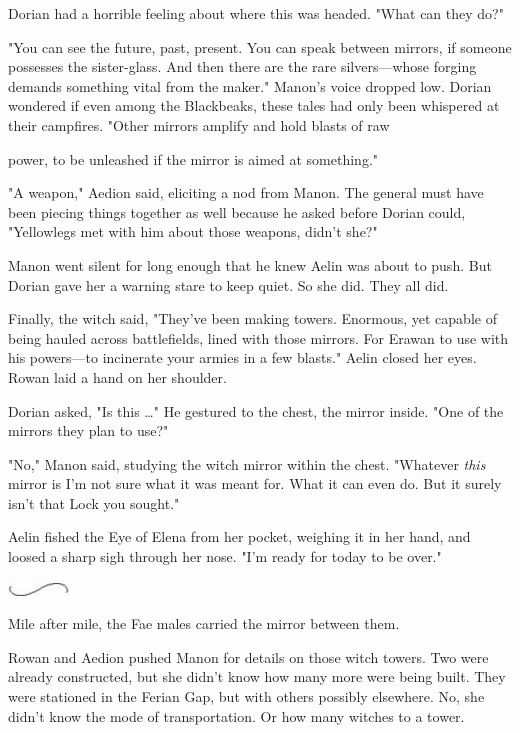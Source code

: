 Dorian had a horrible feeling about where this was headed. "What can they do?"

"You can see the future, past, present. You can speak between mirrors, if someone possesses the sister-glass. And then there are the rare silvers---whose forging demands something vital from the maker." Manon's voice dropped low. Dorian wondered if even among the Blackbeaks, these tales had only been whispered at their campfires. "Other mirrors amplify and hold blasts of raw

power, to be unleashed if the mirror is aimed at something."

"A weapon," Aedion said, eliciting a nod from Manon. The general must have been piecing things together as well because he asked before Dorian could, "Yellowlegs met with him about those weapons, didn't she?"

Manon went silent for long enough that he knew Aelin was about to push. But Dorian gave her a warning stare to keep quiet. So she did. They all did.

Finally, the witch said, "They've been making towers. Enormous, yet capable of being hauled across battlefields, lined with those mirrors. For Erawan to use with his powers---to incinerate your armies in a few blasts." Aelin closed her eyes. Rowan laid a hand on her shoulder.

Dorian asked, "Is this \ldots" He gestured to the chest, the mirror inside. "One of the mirrors they plan to use?"

"No," Manon said, studying the witch mirror within the chest. "Whatever \emph{this} mirror is  I'm not sure what it was meant for. What it can even do. But it surely isn't that Lock you sought."

Aelin fished the Eye of Elena from her pocket, weighing it in her hand, and loosed a sharp sigh through her nose. "I'm ready for today to be over."

\includegraphics[width=0.65in,height=0.13in]{images/seperator}

Mile after mile, the Fae males carried the mirror between them.

Rowan and Aedion pushed Manon for details on those witch towers. Two were already constructed, but she didn't know how many more were being built. They were stationed in the Ferian Gap, but with others possibly elsewhere. No, she didn't know the mode of transportation. Or how many witches to a tower.

